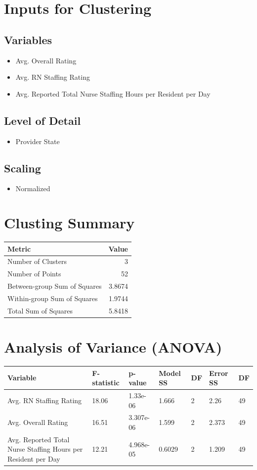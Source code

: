 \documentclass{article}
\theoremstyle{mytheoremstyle}
\theoremstyle{mytheoremstyle}
\theoremstyle{myproblemstyle}
\begin{document}
\section*{Inputs for Clustering}
\subsection*{Variables}
\begin{itemize}
    \item Avg. Overall Rating
    \item Avg. RN Staffing Rating
    \item Avg. Reported Total Nurse Staffing Hours per Resident per Day
\end{itemize}
\subsection*{Level of Detail}
\begin{itemize}
    \item Provider State
\end{itemize}
\subsection*{Scaling}
\begin{itemize}
    \item Normalized
\end{itemize}

\section*{Clusting Summary}
\begin{tabular}{@{}lr@{}}
\toprule
\textbf{Metric} & \textbf{Value} \\
\midrule
Number of Clusters & 3 \\
Number of Points & 52 \\
Between-group Sum of Squares & 3.8674 \\
Within-group Sum of Squares & 1.9744 \\
Total Sum of Squares & 5.8418 \\
\bottomrule
\end{tabular}


\section*{Analysis of Variance (ANOVA)}
{\footnotesize %
\begin{tabular}{@{}lllllll@{}}
\toprule
\textbf{Variable} & \textbf{F-statistic} & \textbf{p-value} & \textbf{Model SS} & \textbf{DF} & \textbf{Error SS} & \textbf{DF} \\
\midrule
Avg. RN Staffing Rating & 18.06 & 1.33e-06 & 1.666 & 2 & 2.26 & 49 \\
Avg. Overall Rating & 16.51 & 3.307e-06 & 1.599 & 2 & 2.373 & 49 \\
Avg. Reported Total Nurse Staffing Hours per Resident per Day & 12.21 & 4.968e-05 & 0.6029 & 2 & 1.209 & 49 \\
\bottomrule
\end{tabular}
}
\end{document}
